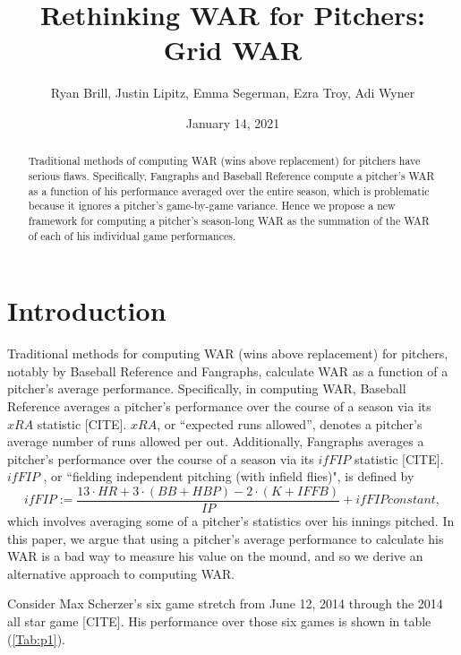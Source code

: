 \documentclass[12pt]{article}
\title{Rethinking WAR for Pitchers: Grid WAR}
\author{Ryan Brill, Justin Lipitz, Emma Segerman, Ezra Troy, Adi Wyner}
\date{January 14, 2021}
\begin{document}
\maketitle

\begin{abstract}
Traditional methods of computing WAR (wins above replacement) for pitchers have serious flaws. Specifically, Fangraphs and Baseball Reference compute a pitcher's WAR as a function of his performance averaged over the entire season, which is problematic because it ignores a pitcher's game-by-game variance. Hence we propose a new framework for computing a pitcher's season-long WAR as the summation of the WAR of each of his individual game performances. 
\end{abstract}

\section{Introduction}


Traditional methods for computing WAR (wins above replacement) for pitchers, notably by Baseball Reference and Fangraphs, calculate WAR as a function of a pitcher's average performance. Specifically, in computing WAR, Baseball Reference averages a pitcher's performance over the course of a season via its $xRA$ statistic [CITE]. $xRA$, or ``expected runs allowed'', denotes a pitcher's average number of runs allowed per out. Additionally, Fangraphs averages a pitcher's performance over the course of a season via its $ifFIP$ statistic [CITE]. $ifFIP$ , or ``fielding independent pitching (with infield flies)", is defined by
$$ifFIP := \frac{13\cdot HR + 3\cdot(BB+HBP) - 2\cdot(K+IFFB)}{IP} + ifFIP constant,$$
which involves averaging some of a pitcher's statistics over his innings pitched. In this paper, we argue that using a pitcher's average performance to calculate his WAR is a bad way to measure his value on the mound, and so we derive an alternative approach to computing WAR.  


Consider Max Scherzer's six game stretch from June 12, 2014 through the 2014 all star game [CITE]. His performance over those six games is shown in table (\ref{Tab:p1}).  \\
\end{document}
